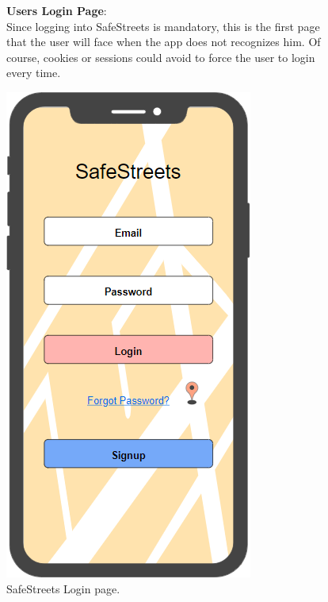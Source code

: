 \begin{figure}
	\begin{flushleft}
		\textbf{Users Login Page}:\\
		Since logging into SafeStreets is mandatory, this is the first page that the user will face when the app does not recognizes him. Of course, cookies or sessions could avoid to force the user to login every time.
	\end{flushleft}
	\centering
	\includegraphics[width=0.6\linewidth]{../RASD/images/mockups/login}
	\caption{SafeStreets Login page.}
\label{fig:login}
\end{figure}
\clearpage
